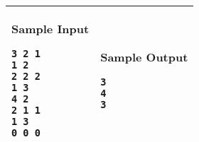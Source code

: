 \begin{table}[!h]
\centering
\begin{tabular}{|l|l|}
\hline
\begin{minipage}[t]{3in}
\textbf{Sample Input}
\begin{verbatim}
3 2 1
1 2
2 2 2
1 3
4 2
2 1 1
1 3
0 0 0
\end{verbatim}
\vspace{1mm}
\end{minipage}
&

\begin{minipage}[t]{3in}
\textbf{Sample Output}
\begin{verbatim}
3
4
3
\end{verbatim}
\vspace{1mm}
\end{minipage} \\
\hline
\end{tabular}
\end{table}

\newpage
